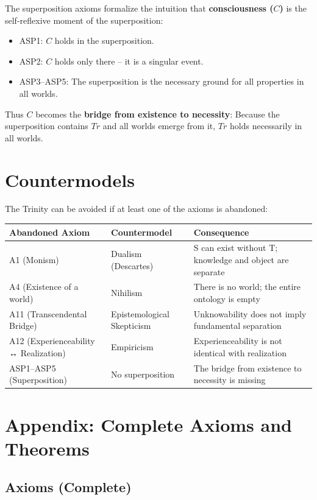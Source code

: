 \documentclass[
]{article}
\begin{document}
The superposition axioms formalize the intuition that \textbf{consciousness (\(C\))} is the self-reflexive moment of the superposition:

\begin{itemize}
\item ASP1: \(C\) holds in the superposition.
\item ASP2: \(C\) holds only there – it is a singular event.
\item ASP3–ASP5: The superposition is the necessary ground for all properties in all worlds.
\end{itemize}

Thus \(C\) becomes the \textbf{bridge from existence to necessity}: Because the superposition contains \(Tr\) and all worlds emerge from it, \(Tr\) holds necessarily in all worlds.

\section{Countermodels}

The Trinity can be avoided if at least one of the axioms is abandoned:

\begin{table}[h]
\centering
\begin{tabular}{lll}
\toprule
\textbf{Abandoned Axiom} & \textbf{Countermodel} & \textbf{Consequence} \\
\midrule
A1 (Monism) & Dualism (Descartes) & S can exist without T; knowledge and object are separate \\
A4 (Existence of a world) & Nihilism & There is no world; the entire ontology is empty \\
A11 (Transcendental Bridge) & Epistemological Skepticism & Unknowability does not imply fundamental separation \\
A12 (Experienceability ↔ Realization) & Empiricism & Experienceability is not identical with realization \\
ASP1–ASP5 (Superposition) & No superposition & The bridge from existence to necessity is missing \\
\bottomrule
\end{tabular}
\end{table}

\section{Appendix: Complete Axioms and Theorems}

\subsection{Axioms (Complete)}
\end{document}
